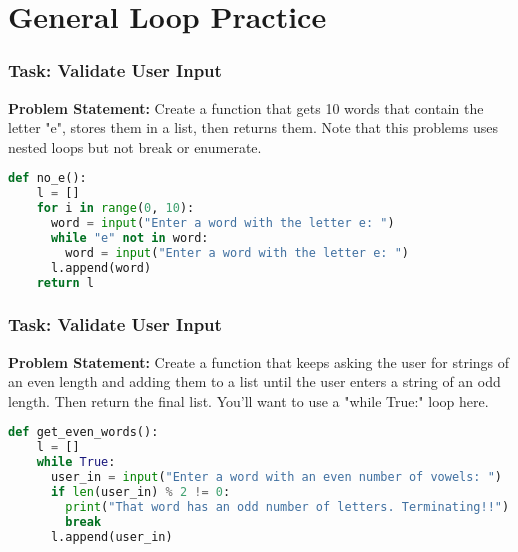 \documentclass{beamer}
\begin{document}
\section{General Loop Practice}

%
%
\begin{frame}[fragile]
  \frametitle{Task: Validate User Input}
  \textbf{Problem Statement:} Create a function that gets 10 words that contain the letter "e", stores them in a list, then returns them. Note that this problems uses nested loops but not break or enumerate.
  \vfill
  \pause
  \begin{lstlisting}[language=Python, autogobble]
  def no_e():
    l = []
    for i in range(0, 10):
      word = input("Enter a word with the letter e: ")
      while "e" not in word:
        word = input("Enter a word with the letter e: ")
      l.append(word)
    return l
  \end{lstlisting}
\end{frame}

%
%
\begin{frame}[fragile]
  \frametitle{Task: Validate User Input}
  \textbf{Problem Statement:} Create a function that keeps asking the user for strings of an even length and adding them to a list until the user enters a string of an odd length. Then return the final list. You'll want to use a "while True:" loop here.
  \vfill
  \pause
  \begin{lstlisting}[language=Python, autogobble]
  def get_even_words():
    l = []
    while True:
      user_in = input("Enter a word with an even number of vowels: ")
      if len(user_in) % 2 != 0:
        print("That word has an odd number of letters. Terminating!!")
        break
      l.append(user_in)
  \end{lstlisting}
\end{frame}
\end{document}
